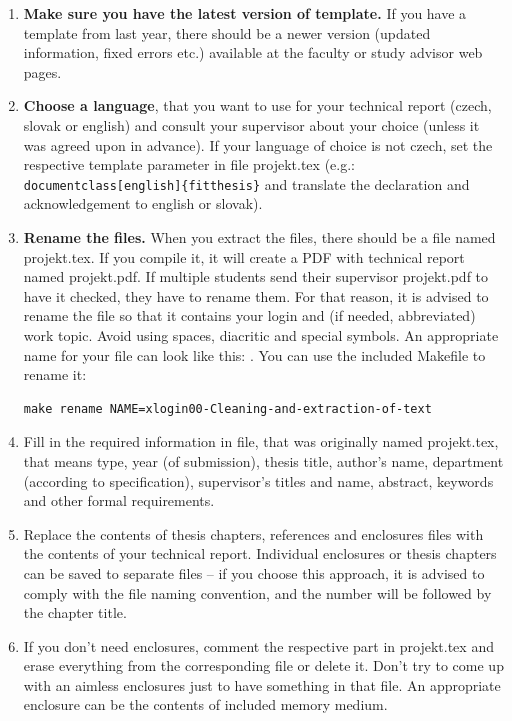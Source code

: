 \begin{enumerate}
  \item \textbf{Make sure you have the latest version of template.} If you have a template from last year, there should be a newer version (updated information, fixed errors etc.) available at the faculty or study advisor web pages.  
  \item \textbf{Choose a language}, that you want to use for your technical report (czech, slovak or english) and consult your supervisor about your choice (unless it was agreed upon in advance). If your language of choice is not czech, set the respective template parameter in file projekt.tex (e.g.: \verb|document|\verb|class[english]{fitthesis}| and translate the declaration and acknowledgement to english or slovak).
  \item \textbf{Rename the files.} When you extract the files, there should be a file named projekt.tex. If you compile it, it will create a PDF with technical report named projekt.pdf. If multiple students send their supervisor projekt.pdf to have it checked, they have to rename them. For that reason, it is advised to rename the file so that it contains your login and (if needed, abbreviated) work topic. Avoid using spaces, diacritic and special symbols. An appropriate name for your file can look like this: . You can use the included Makefile to rename it: 
\begin{verbatim}
make rename NAME=xlogin00-Cleaning-and-extraction-of-text
\end{verbatim}
  \item Fill in the required information in file, that was originally named projekt.tex, that means type, year (of submission), thesis title, author's name, department (according to specification), supervisor's titles and name, abstract, keywords and other formal requirements.
  \item Replace the contents of thesis chapters, references and enclosures files with the contents of your technical report. Individual enclosures or thesis chapters can be saved to separate files -- if you choose this approach, it is advised to comply with the file naming convention, and the number will be followed by the chapter title.
  \item If you don't need enclosures, comment the respective part in projekt.tex and erase everything from the corresponding file or delete it. Don't try to come up with an aimless enclosures just to have something in that file. An appropriate enclosure can be the contents of included memory medium.

\end{enumerate}
